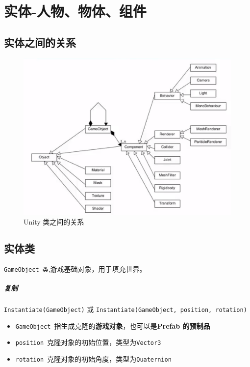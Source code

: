 \documentclass[UTF8,a4paper,12pt]{ctexbook}
\begin{document}
\chapter{实体-人物、物体、组件}
	
	\section{实体之间的关系}
		\begin{figure}[H]
			\centering
			\includegraphics[scale=0.5]{class}
			\caption{Unity 类之间的关系}
		\end{figure}	
		
	\section{实体类} \verb|GameObject 类|,游戏基础对象，用于填充世界。
		\paragraph{复制}
			\verb|Instantiate(GameObject)| 或 \verb|Instantiate(GameObject, position, rotation)|
			
			\begin{itemize}
				\item \verb|GameObject |指生成克隆的\textbf{游戏对象}，也可以是\textbf{Prefab 的预制品}
				\item \verb|position |克隆对象的初始位置，类型为\verb|Vector3|
				\item \verb|rotation |克隆对象的初始角度，类型为\verb|Quaternion|
			\end{itemize} 
		
\end{document}

